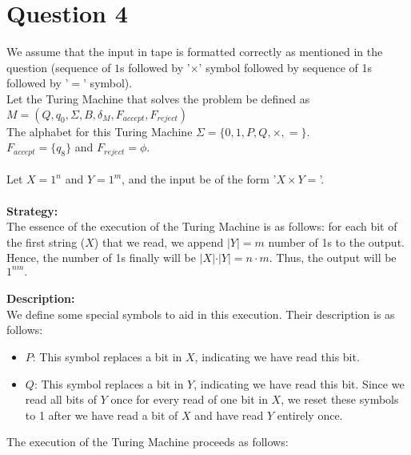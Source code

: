 \documentclass[12pt,a4paper]{article}
\begin{document}
\section{Question 4}
We assume that the input in tape is formatted correctly as mentioned in the question (sequence of $1$s followed by '$\times$' symbol followed by sequence of 1s followed by '$=$' symbol).
\\Let the Turing Machine that solves the problem be defined as $M = (Q,q_0,\Sigma,B,\delta_M,F_{accept},F_{reject})$
\\The alphabet for this Turing Machine $\Sigma = \{0,1,P,Q, \times, =\}$.
\\$F_{accept} = \{q_8\} $ and $F_{reject} = \phi$.
\\
\\Let $X=1^n$ and $Y=1^m$, and the input be of the form '$X \times Y=$'.
\\
\\\textbf{Strategy:}
\\The essence of the execution of the Turing Machine is as follows: for each bit of the first string ($X$) that we read, we append $\vert Y \vert = m$ number of 1s to the output.
\\Hence, the number of 1s finally will be $\vert X \vert \cdot \vert Y \vert = n \cdot m$. Thus, the output will be $1^{nm}.$\\
\\\textbf{Description:}\\
We define some special symbols to aid in this execution. Their description is as follows:
\begin{itemize}
    \item $P$: This symbol replaces a bit in $X$, indicating we have read this bit. 
    \item $Q$: This symbol replaces a bit in $Y$, indicating we have read this bit. Since we read all bits of $Y$ once for every read of one bit in $X$, we reset these symbols to 1 after we have read a bit of $X$ and have read $Y$ entirely once.
\end{itemize}
The execution of the Turing Machine proceeds as follows:
\end{document}
